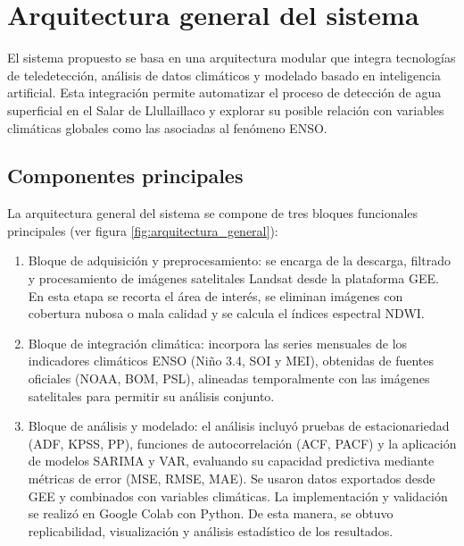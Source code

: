 \newpage
\section{Arquitectura general del sistema}

El sistema propuesto se basa en una arquitectura modular que integra tecnologías de teledetección, análisis de datos climáticos y modelado basado en inteligencia artificial. Esta integración permite automatizar el proceso de detección de agua superficial en el Salar de Llullaillaco y explorar su posible relación con variables climáticas globales como las asociadas al fenómeno ENSO.

\subsection*{Componentes principales}

La arquitectura general del sistema se compone de tres bloques funcionales principales (ver figura \ref{fig:arquitectura_general}):

\begin{enumerate}
    \item Bloque de adquisición y preprocesamiento: se encarga de la descarga, filtrado y procesamiento de imágenes satelitales Landsat desde la plataforma GEE. En esta etapa se recorta el área de interés, se eliminan imágenes con cobertura nubosa o mala calidad y se calcula el índices espectral NDWI.
    
    \item Bloque de integración climática: incorpora las series mensuales de los indicadores climáticos ENSO (Niño 3.4, SOI y MEI), obtenidas de fuentes oficiales (NOAA, BOM, PSL), alineadas temporalmente con las imágenes satelitales para permitir su análisis conjunto.

    \item Bloque de análisis y modelado: el análisis incluyó pruebas de estacionariedad (ADF, KPSS, PP), funciones de autocorrelación (ACF, PACF) y la aplicación de modelos SARIMA y VAR, evaluando su capacidad predictiva mediante métricas de error (MSE, RMSE, MAE). Se usaron datos exportados desde GEE y combinados con variables climáticas. La implementación y validación se realizó en Google Colab con Python. De esta manera, se obtuvo replicabilidad, visualización y análisis estadístico de los resultados.
\end{enumerate}

